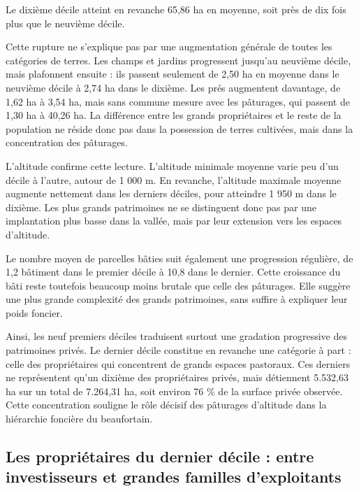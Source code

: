 \documentclass[12pt,a4paper]{report}
\begin{document}
	
	
	Le dixième décile atteint en revanche 65,86 ha en moyenne, soit près de dix fois plus que le neuvième décile.
	
	Cette rupture ne s'explique pas par une augmentation générale de toutes les catégories de terres. Les champs et jardins progressent jusqu'au neuvième décile, mais plafonnent ensuite : ils passent seulement de 2,50 ha en moyenne dans le neuvième décile à 2,74 ha dans le dixième. Les prés augmentent davantage, de 1,62 ha à 3,54 ha, mais sans commune mesure avec les pâturages, qui passent de 1,30 ha à 40,26 ha. La différence entre les grands propriétaires et le reste de la population ne réside donc pas dans la possession de terres cultivées, mais dans la concentration des pâturages.

\vspace{1em}

	L'altitude confirme cette lecture. L'altitude minimale moyenne varie peu d'un décile à l'autre, autour de 1 000 m. En revanche, l'altitude maximale moyenne augmente nettement dans les derniers déciles, pour atteindre 1 950 m dans le dixième. Les plus grands patrimoines ne se distinguent donc pas par une implantation plus basse dans la vallée, mais par leur extension vers les espaces d'altitude.
	
	Le nombre moyen de parcelles bâties suit également une progression régulière, de 1,2 bâtiment dans le premier décile à 10,8 dans le dernier. Cette croissance du bâti reste toutefois beaucoup moins brutale que celle des pâturages. Elle suggère une plus grande complexité des grands patrimoines, sans suffire à expliquer leur poids foncier.
	
\vspace{1em}
	
	Ainsi, les neuf premiers déciles traduisent surtout une gradation progressive des patrimoines privés. Le dernier décile constitue en revanche une catégorie à part : celle des propriétaires qui concentrent de grands espaces pastoraux. Ces derniers ne représentent qu'un dixième des propriétaires privés, mais détiennent 5.532,63 ha sur un total de 7.264,31 ha, soit environ 76 \% de la surface privée observée. Cette concentration souligne le rôle décisif des pâturages d'altitude dans la hiérarchie foncière du beaufortain.
	
	\subsection{Les propriétaires du dernier décile : entre investisseurs et grandes familles d'exploitants}
	
\end{document}
